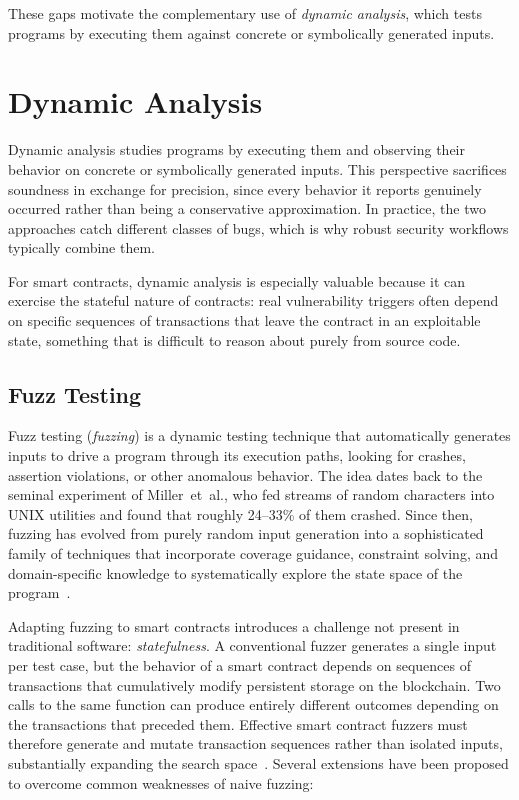 These gaps motivate the complementary use of \emph{dynamic analysis}, which tests programs by executing them against concrete or symbolically generated inputs.

\section{Dynamic Analysis}
\label{sec:dynamic-analysis}

Dynamic analysis studies programs by executing them and observing their behavior on concrete or symbolically generated inputs. This perspective sacrifices soundness in exchange for precision, since every behavior it reports genuinely occurred rather than being a conservative approximation. In practice, the two approaches catch different classes of bugs, which is why robust security workflows typically combine them.

For smart contracts, dynamic analysis is especially valuable because it can exercise the stateful nature of contracts: real vulnerability triggers often depend on specific sequences of transactions that leave the contract in an exploitable state, something that is difficult to reason about purely from source code.

\subsection{Fuzz Testing}
\label{subsec:fuzz-testing}

Fuzz testing (\emph{fuzzing}) is a dynamic testing technique that automatically generates inputs to drive a program through its execution paths, looking for crashes, assertion violations, or other anomalous behavior. The idea dates back to the seminal experiment of Miller~et~al., who fed streams of random characters into UNIX utilities and found that roughly 24--33\% of them crashed. Since then, fuzzing has evolved from purely random input generation into a sophisticated family of techniques that incorporate coverage guidance, constraint solving, and domain-specific knowledge to systematically explore the state space of the program~\cite{miller1990empirical}.

Adapting fuzzing to smart contracts introduces a challenge not present in traditional software: \emph{statefulness}. A conventional fuzzer generates a single input per test case, but the behavior of a smart contract depends on sequences of transactions that cumulatively modify persistent storage on the blockchain. Two calls to the same function can produce entirely different outcomes depending on the transactions that preceded them. Effective smart contract fuzzers must therefore generate and mutate transaction sequences rather than isolated inputs, substantially expanding the search space~\cite{choi2021smartian}. Several extensions have been proposed to overcome common weaknesses of naive fuzzing:

